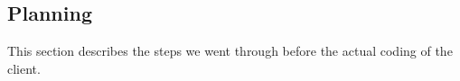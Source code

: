 \subsection{Planning}
This section describes the steps we went through before the actual coding of the client.


\newpage